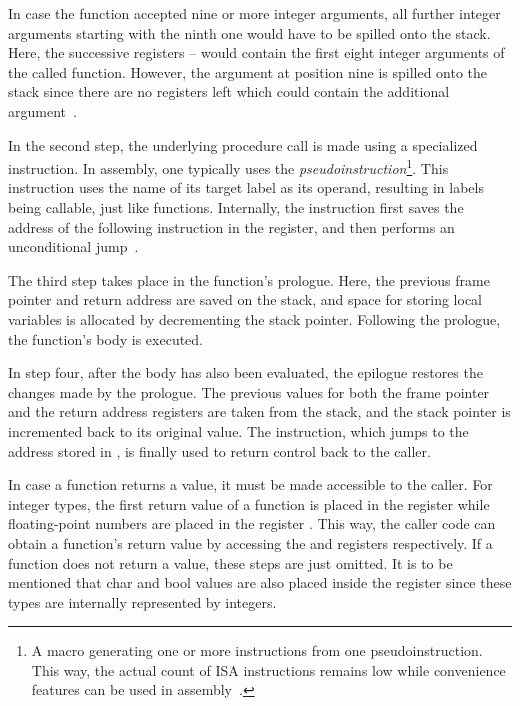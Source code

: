 In case the function accepted nine or more integer arguments,
all further integer arguments starting with the ninth one would have to be spilled onto the stack.
Here, the successive registers -- would contain the first eight integer arguments of the called function.
However, the argument at position nine is spilled onto the stack since there are no registers left which could contain the additional argument~\cite[p.~8]{RiscvABI2022}.

In the second step, the underlying procedure call is made using a specialized instruction.
In \riscv{} assembly, one typically uses the  \emph{pseudoinstruction}\footnote{A macro generating one or more instructions from one pseudoinstruction. This way, the actual count of ISA instructions remains low while convenience features can be used in assembly~\cite[p.~68]{Dandamudi2005}.}.
This instruction uses the name of its target label as its operand, resulting in labels being callable, just like functions.
Internally, the instruction first saves the address of the following instruction in the  register, and then performs an unconditional jump~\cite[p.~22]{Patterson2017}.

The third step takes place in the function's prologue.
Here, the previous frame pointer and return address are saved on the stack,
and space for storing local variables is allocated by decrementing the stack pointer.
Following the prologue, the function's body is executed.

In step four, after the body has also been evaluated, the epilogue restores the changes made by the prologue.
The previous values for both the frame pointer and the return address registers are taken from the stack,
and the stack pointer is incremented back to its original value.
The  instruction, which jumps to the address stored in , is finally used to return control back to the caller.

In case a function returns a value, it must be made accessible to the caller.
For integer types, the first return value of a function is placed in the register 
while floating-point numbers are placed in the register .
This way, the caller code can obtain a function's return value by accessing the  and  registers respectively.
If a function does not return a value, these steps are just omitted.
It is to be mentioned that char and bool values are also placed inside the  register since these types are internally represented by integers.

